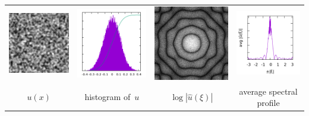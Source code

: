 \begin{tabular}{cccc}
	\includegraphics{d256.png} &
	\includegraphics{d256_h.png} &
	\includegraphics{d256_f.png} &
	\includegraphics{d256_p.png} \\
	$u(x)$ &
	histogram of~$u$ &
	$\log|\hat u(\xi)|$ &
	average spectral profile
\end{tabular}
